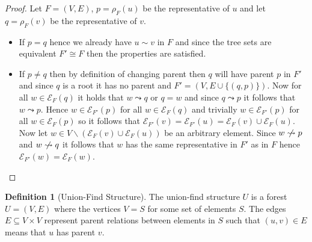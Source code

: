 \documentclass[a4paper,12pt]{article}
\theoremstyle{definition}
\newtheorem{definition}{Definition}[section]
\begin{document}
\begin{proof}
    Let $F = (V, E)$, $p = \rho_F(u)$ be the representative of $u$ and
    let $q = \rho_F(v)$ be the representative of $v$.
    \begin{itemize}
        \item If $p = q$ hence we already have $u \sim v$ in $F$ and since the
        tree sets are equivalent $F' \cong F$ then the properties are satisfied.
        \item If $p \neq q$ then by definition of changing parent then $q$ will
        have parent $p$ in $F'$ and since $q$ is a root it has no parent and $F'
        = (V, E \cup \{(q, p)\})$. Now for all $w \in \mathcal{E}_F(q)$ it holds
        that $w \leadsto q$ or $q = w$ and since $q \leadsto p$ it follows that
        $w \leadsto p$. Hence $w \in \mathcal{E}_{F'}(p)$ for all $w \in
        \mathcal{E}_F(q)$ and trivially $w \in \mathcal{E}_{F'}(p)$ for all $w
        \in \mathcal{E}_F(p)$ so it follows that $\mathcal{E}_{F'}(v) =
        \mathcal{E}_{F'}(u) = \mathcal{E}_F(v) \cup \mathcal{E}_F(u)$. Now let
        $w \in V \backslash (\mathcal{E}_F(v) \cup \mathcal{E}_F(u))$ be an
        arbitrary element. Since $w \centernot\leadsto p$ and $w
        \centernot\leadsto q$ it follows that $w$ has the same representative in
        $F'$ as in $F$ hence $\mathcal{E}_{F'}(w) = \mathcal{E}_F(w)$. 
    \end{itemize}
\end{proof}

\begin{definition}[Union-Find Structure]
    The union-find structure $U$ is a forest $U = (V, E)$ where the vertices $V
    = S$ for some set of elements $S$. The edges $E \subseteq V \times V$
    represent parent relations between elements in $S$ such that $(u, v) \in E$
    means that $u$ has parent $v$.
\end{definition}
\end{document}
